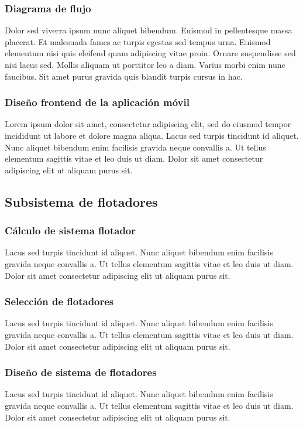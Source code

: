 \subsubsection{Diagrama de flujo}

Dolor sed viverra ipsum nunc aliquet bibendum. Euismod in pellentesque massa placerat. Et malesuada fames ac turpis egestas sed tempus urna. Euismod elementum nisi quis eleifend quam adipiscing vitae proin. Ornare suspendisse sed nisi lacus sed. Mollis aliquam ut porttitor leo a diam. Varius morbi enim nunc faucibus. Sit amet purus gravida quis blandit turpis cursus in hac.

\subsubsection{Diseño frontend de la aplicación móvil}

Lorem ipsum dolor sit amet, consectetur adipiscing elit, sed do eiusmod tempor incididunt ut labore et dolore magna aliqua. Lacus sed turpis tincidunt id aliquet. Nunc aliquet bibendum enim facilisis gravida neque convallis a. Ut tellus elementum sagittis vitae et leo duis ut diam. Dolor sit amet consectetur adipiscing elit ut aliquam purus sit. 


\subsection{Subsistema de flotadores}

\subsubsection{Cálculo de sistema flotador}

Lacus sed turpis tincidunt id aliquet. Nunc aliquet bibendum enim facilisis gravida neque convallis a. Ut tellus elementum sagittis vitae et leo duis ut diam. Dolor sit amet consectetur adipiscing elit ut aliquam purus sit. 

\subsubsection{Selección de flotadores}

Lacus sed turpis tincidunt id aliquet. Nunc aliquet bibendum enim facilisis gravida neque convallis a. Ut tellus elementum sagittis vitae et leo duis ut diam. Dolor sit amet consectetur adipiscing elit ut aliquam purus sit. 

\subsubsection{Diseño de sistema de flotadores}

Lacus sed turpis tincidunt id aliquet. Nunc aliquet bibendum enim facilisis gravida neque convallis a. Ut tellus elementum sagittis vitae et leo duis ut diam. Dolor sit amet consectetur adipiscing elit ut aliquam purus sit. 
